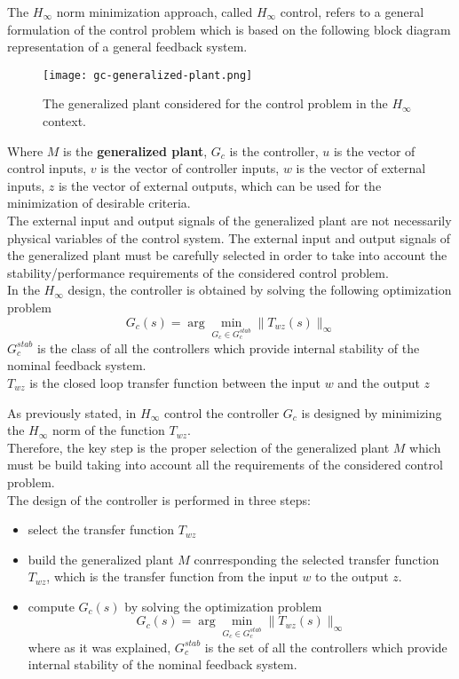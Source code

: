 The $H_\infty$ norm minimization approach, called $H_\infty$ control, refers to a general formulation of the control problem which is based on the following block diagram representation of a general feedback system.

 \begin{figure}[H]
    \centering
    \texttt{[image: gc-generalized-plant.png]}
    \caption{The generalized plant considered for the control problem in the $H_\infty$ context.}
 \end{figure}
 
Where $M$ is the \textbf{generalized plant}, $G_c$ is the controller, $u$ is the vector of control inputs, $v$ is the vector of controller inputs, $w$ is the vector of external inputs, $z$ is the vector of external outputs, which can be used for the minimization of desirable criteria. \\

The external input and output signals of the generalized plant are not necessarily physical variables of the control system. The external input and output signals of the generalized plant must be carefully selected in order to take into account the stability/performance requirements of the considered control problem.\\

In the $H_\infty$ design, the controller is obtained by solving the following optimization problem
\[
G_c(s) = \arg \min\limits_{G_c \in G_c^{stab}} \|T_{wz}(s)\|_\infty
\]
$G_c^{stab}$ is the class of all the controllers which provide internal stability of the nominal feedback system.\\

$T_{wz}$ is the closed loop transfer function between the input $w$ and the output $z$

As previously stated, in $H_\infty$ control the controller $G_c$ is designed by minimizing the $H_\infty$ norm of the function $T_{wz}$.\\

Therefore, the key step is the proper selection of the generalized plant $M$ which must be build taking into account all the requirements of the considered control problem.\\

The design of the controller is performed in three steps:
\begin{itemize}
    \item select the transfer function $T_{wz}$
    \item build the generalized plant $M$ conrresponding the selected transfer function $T_{wz}$, which is the transfer function from the input $w$ to the output $z$.
    \item compute $G_c(s)$ by solving the optimization problem
    \[
    G_c(s) = \arg \min\limits_{G_c \in G_c^{stab}} \|T_{wz}(s)\|_\infty
    \]
    where as it was explained, $G_c^{stab}$ is the set of all the controllers which provide internal stability of the nominal feedback system.
\end{itemize}


